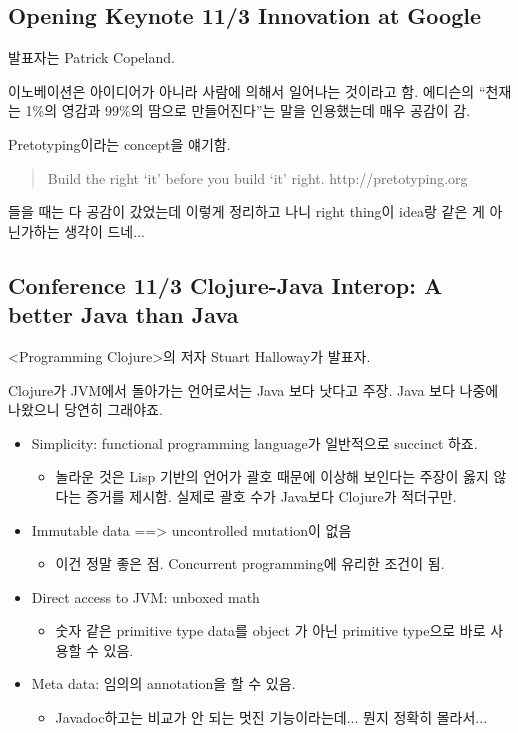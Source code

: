 \documentclass[a4paper]{article}
\begin{document}
\subsection{Opening Keynote 11/3 Innovation at Google}
 
발표자는 Patrick Copeland.
 
이노베이션은 아이디어가 아니라 사람에 의해서 일어나는 것이라고 함.
에디슨의 ``천재는 1\%의 영감과 99\%의 땀으로 만들어진다''는 말을
인용했는데 매우 공감이 감.
 
Pretotyping이라는 concept을 얘기함.
\begin{quote}
Build the right `it' before you build `it' right.
http://pretotyping.org  
\end{quote}
 
들을 때는 다 공감이 갔었는데 이렇게 정리하고 나니 right thing이 idea랑
같은 게 아닌가하는 생각이 드네...
 
\subsection{Conference 11/3 Clojure-Java Interop: A better Java than Java}
 
<Programming Clojure>의 저자 Stuart Halloway가 발표자.
 
Clojure가 JVM에서 돌아가는 언어로서는 Java 보다 낫다고 주장. Java 보다
나중에 나왔으니 당연히 그래야죠.
 
\begin{itemize}
\item Simplicity: functional programming language가 일반적으로 succinct 하죠.
  \begin{itemize}
  \item 놀라운 것은 Lisp 기반의 언어가 괄호 때문에 이상해 보인다는
    주장이 옳지 않다는 증거를 제시함. 실제로 괄호 수가 Java보다
    Clojure가 적더구만.
  \end{itemize}

\item Immutable data ==> uncontrolled mutation이 없음
  \begin{itemize}
  \item 이건 정말 좋은 점. Concurrent programming에 유리한 조건이 됨.
  \end{itemize}

\item Direct access to JVM: unboxed math
  \begin{itemize}
  \item 숫자 같은 primitive type data를 object 가 아닌 primitive
    type으로 바로 사용할 수 있음.
  \end{itemize}

\item Meta data: 임의의 annotation을 할 수 있음.
  \begin{itemize}
  \item Javadoc하고는 비교가 안 되는 멋진 기능이라는데... 뭔지 정확히
    몰라서...
  \end{itemize}
\end{itemize}
 
\end{document}
